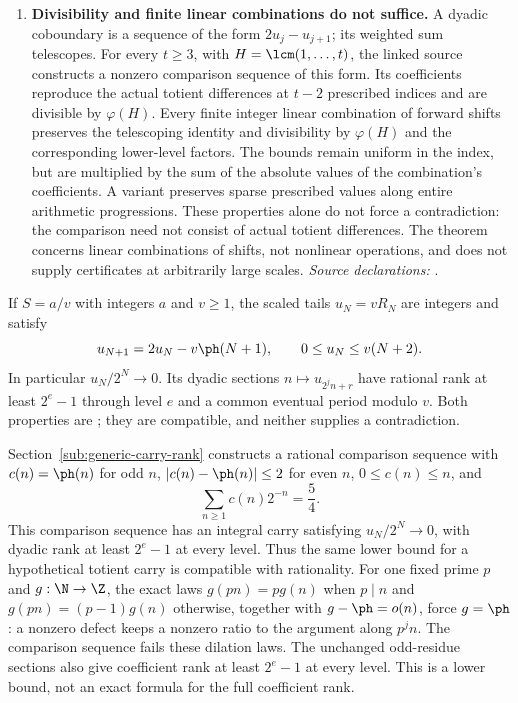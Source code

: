 \begin{enumerate}
\item\label{res:factorideal}
\textbf{Divisibility and finite linear combinations do not suffice.}
A dyadic coboundary is a sequence of the form $2u_j-u_{j+1}$; its weighted
sum telescopes. For every $t\ge3$, with $H=\lcm(1,\ldots,t)$, the linked
source constructs a nonzero comparison sequence of this form. Its
coefficients reproduce the actual totient differences at $t-2$
prescribed indices and are divisible by $\varphi(H)$. Every finite integer
linear combination of forward shifts preserves the telescoping identity and
divisibility by $\varphi(H)$ and the corresponding lower-level factors.
The bounds remain uniform in the index, but are multiplied by the sum
of the absolute values of the combination's coefficients.
A variant preserves sparse prescribed values along entire arithmetic
progressions. These properties alone do not force a contradiction: the
comparison need not consist of actual totient differences. The theorem
concerns linear combinations of shifts, not nonlinear operations, and
does not supply certificates at arbitrarily large scales.
{\footnotesize\emph{Source declarations:}
.}
\end{enumerate}

If $S=a/v$ with integers $a$ and $v\ge1$, the scaled tails $u_N=vR_N$
are integers and satisfy
\[
 u_{N+1}=2u_N-v\ph(N+1),\qquad 0\le u_N\le v(N+2).
\]
In particular $u_N/2^N\to0$. Its dyadic sections $n\mapsto u_{2^jn+r}$ have rational rank at
least $2^e-1$ through level $e$ and a common eventual period modulo $v$.
Both properties are
;
they are compatible, and neither supplies a contradiction.

Section~\ref{sub:generic-carry-rank} constructs a rational
comparison sequence with
$c(n)=\ph(n)$ for odd $n$, $|c(n)-\ph(n)|\le2$ for even $n$, $0\le c(n)\le n$,
and
\[
 \sum_{n\ge1}c(n)2^{-n}=\frac54.
\]
This comparison sequence has an integral carry satisfying
$u_N/2^N\to0$, with dyadic rank at least $2^e-1$ at every level. Thus the same lower bound for a hypothetical totient carry is
compatible with rationality. For one fixed prime $p$ and $g:\N\to\Z$, the exact laws
$g(pn)=p g(n)$ when $p\mid n$ and $g(pn)=(p-1)g(n)$ otherwise, together
with $g-\ph=o(n)$, force $g=\ph$: a nonzero defect keeps a nonzero ratio
to the argument along $p^j n$. The comparison sequence fails these dilation laws. The unchanged odd-residue sections
also give coefficient rank at least $2^e-1$ at every level. This is a
lower bound, not an exact formula for the full coefficient rank.


